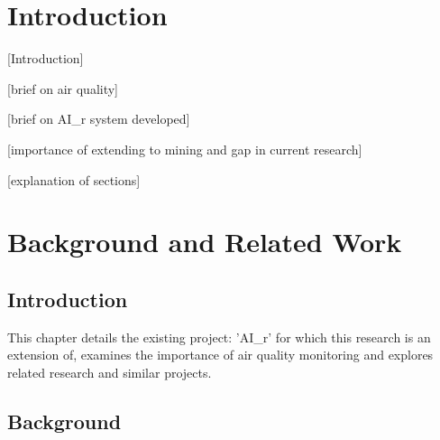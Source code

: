 \documentclass[a4paper,twoside,12pt]{report}
\begin{document}
\tableofcontents
\newpage
{}
{}
\listoffigures
\newpage
{}
{}
\listoftables
\newpage
{}

\chapter{Introduction}
[Introduction]

[brief on air quality]

[brief on AI\_r system developed]

[importance of extending to mining and gap in current research]

[explanation of sections]

\chapter{Background and Related Work}

\section{Introduction}
This chapter details the existing project: 'AI\_r' for which this research is an extension of, examines the importance of air quality monitoring and explores related research and similar projects.

\section{Background}
\end{document}

